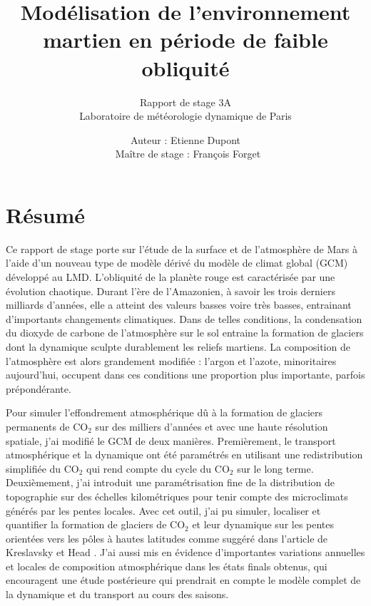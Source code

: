 \documentclass[11pt,a4paper]{article}
\title{Modélisation de l'environnement martien en période de faible obliquité}
\subtitle{ Rapport de stage 3A\\ 
             Laboratoire de météorologie dynamique de Paris}
\author{Auteur : Etienne Dupont \\ Maître de stage : François Forget}
\begin{document}
\maketitle

\newpage
\thispagestyle{empty}
\hfill
\newpage
\addtocounter{page}{-1}

\newpage
\thispagestyle{empty}
\hfill
\newpage
\addtocounter{page}{-1}

\clearpage
\section*{Résumé}
Ce rapport de stage porte sur l'étude de la surface et de l'atmosphère de Mars à l'aide d'un nouveau type de modèle dérivé du modèle de climat global (GCM) développé au LMD.  L'obliquité de la planète rouge est caractérisée par une évolution chaotique. Durant l'ère de l'Amazonien, à savoir les trois derniers milliards d'années, elle a atteint des valeurs basses voire très basses, entrainant d'importants changements climatiques. Dans de telles conditions, la condensation du dioxyde de carbone de l'atmosphère sur le sol entraine la formation de glaciers dont la dynamique sculpte durablement les reliefs martiens. La composition de l'atmosphère est alors grandement modifiée : l'argon et l'azote, minoritaires aujourd'hui, occupent dans ces conditions une proportion plus importante, parfois prépondérante. 

Pour simuler l'effondrement atmosphérique dû à la formation de glaciers permanents de CO$_2$ sur des milliers d'années et avec une haute résolution spatiale, j'ai modifié le GCM de deux manières. Premièrement, le transport atmosphérique et la dynamique ont été paramétrés en utilisant une redistribution simplifiée du CO$_2$ qui rend compte du cycle du CO$_2$ sur le long terme. Deuxièmement, j'ai introduit une paramétrisation fine de la distribution de topographie sur des échelles kilométriques pour tenir compte des microclimats générés par les pentes locales. Avec cet outil, j'ai pu simuler, localiser et quantifier la formation de glaciers de CO$_2$ et leur dynamique sur les pentes orientées vers les pôles à hautes latitudes comme suggéré dans l'article de Kreslavsky et Head \citep{Kres:05}. J'ai aussi mis en évidence d'importantes variations annuelles et locales de composition atmosphérique dans les états finals obtenus, qui encouragent une étude postérieure qui prendrait en compte le modèle complet de la dynamique et du transport au cours des saisons.
\end{document}
